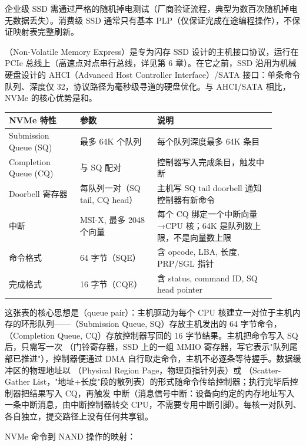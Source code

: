企业级 SSD 需通过严格的随机掉电测试（厂商验证流程，典型为数百次随机掉电无数据丢失）。消费级 SSD 通常只有基本 PLP（仅保证完成在途编程操作），不保证映射表完整刷新。


（Non-Volatile Memory Express）是专为闪存 SSD 设计的主机接口协议，运行在 PCIe 总线上（高速点对点串行总线，详见第 6 章）。在它之前，SSD 沿用为机械硬盘设计的 AHCI（Advanced Host Controller Interface）/SATA 接口：单条命令队列、深度仅 32，协议路径为毫秒级寻道的硬盘优化。与 AHCI/SATA 相比，NVMe 的核心优势是和。

\begin{longtable}{L{0.24\linewidth}L{0.26\linewidth}L{0.4\linewidth}}
\toprule
NVMe 特性 & 参数 & 说明 \\
\midrule
Submission Queue (SQ) & 最多 64K 个队列 & 每个队列深度最多 64K 条目 \\
Completion Queue (CQ) & 与 SQ 配对 & 控制器写入完成条目，触发中断 \\
Doorbell 寄存器 & 每队列一对（SQ tail, CQ head） & 主机写 SQ tail doorbell 通知控制器有新命令 \\
中断 & MSI-X, 最多 2048 个向量 & 每个 CQ 绑定一个中断向量→CPU 核；64K 是队列数上限，不是向量数上限 \\
命令格式 & 64 字节（SQE） & 含 opcode, LBA, 长度, PRP/SGL 指针 \\
完成格式 & 16 字节（CQE） & 含 status, command ID, SQ head pointer \\
\bottomrule
\end{longtable}

这张表的核心思想是（queue pair）：主机驱动为每个 CPU 核建立一对位于主机内存的环形队列——（Submission Queue, SQ）存放主机发出的 64 字节命令，（Completion Queue, CQ）存放控制器写回的 16 字节结果。主机把命令写入 SQ 后，只需写一次 （门铃寄存器，SSD 上的一组 MMIO 寄存器，写它表示"队列尾部已推进"），控制器便通过 DMA 自行取走命令，主机不必逐条等待握手。数据缓冲区的物理地址以 （Physical Region Page，物理页指针列表）或 （Scatter-Gather List，"地址+长度"段的散列表）的形式随命令传给控制器；执行完毕后控制器把结果写入 CQ，再触发  中断（消息信号中断：设备向约定的内存地址写入一条中断消息，由中断控制器转交 CPU，不需要专用中断引脚）。每核一对队列、各自独立，提交路径上没有任何共享锁。

NVMe 命令到 NAND 操作的映射：

